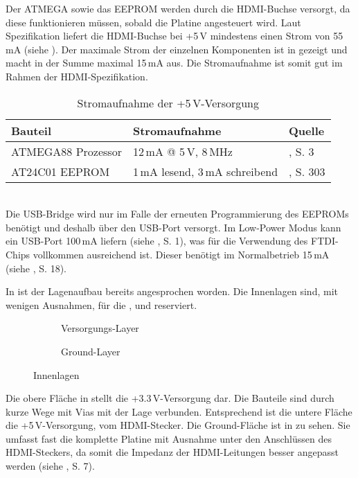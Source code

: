 Der ATMEGA sowie das EEPROM werden durch die HDMI-Buchse versorgt, da diese funktionieren müssen, sobald die Platine angesteuert wird. Laut Spezifikation liefert die HDMI-Buchse bei +5\,V mindestens einen Strom von 55\,mA (siehe \cite{HDMI11}). Der maximale Strom der einzelnen Komponenten ist in  gezeigt und macht in der Summe maximal 15\,mA aus. Die Stromaufnahme ist somit gut im Rahmen der HDMI-Spezifikation.
\begin{table}[h]
\begin{tabular}{|p{4cm}|p{5cm}|p{3.5cm}|}\hline
\rowcolor{TableBackgroundColor} 
   \textbf{Bauteil} & \textbf{Stromaufnahme} & \textbf{Quelle}	\\ \hline
    ATMEGA88 Prozessor & 12\,mA @ 5\,V, 8\,MHz	& \cite{Atmel2011}, S. 3\\ \hline
	AT24C01 EEPROM & 1\,mA lesend, 3\,mA schreibend & \cite{Atmel2003}, S. 303\\ \hline
\end{tabular}
\caption{Stromaufnahme der +5\,V-Versorgung}
\label{tab:5v_strom}
\end{table} \\
Die USB-Bridge  wird nur im Falle der erneuten Programmierung des EEPROMs benötigt und deshalb über den USB-Port versorgt. Im Low-Power Modus kann ein USB-Port 100\,mA liefern (siehe \cite{USB2005}, S. 1), was für die Verwendung des FTDI-Chips vollkommen ausreichend ist. Dieser benötigt im Normalbetrieb 15\,mA (siehe \cite{FTDI2010}, S. 18).

In  ist der Lagenaufbau bereits angesprochen worden. Die Innenlagen sind, mit wenigen Ausnahmen, für die ,  und  reserviert. 
\begin{figure}[htbp]
        \centering
        \begin{subfigure}[htp]{0.48\textwidth}
                \caption{Versorgungs-Layer}
                \label{fig:teilb_vcc_layer}
        \end{subfigure}
		\quad 
        \begin{subfigure}[htp]{0.48\textwidth}
                             								\caption{Ground-Layer}
                \label{fig:teilb_gnd_layer}
        \end{subfigure}
        \caption{Innenlagen}
        \label{fig:teilb_vcc_gnd_layer}
\end{figure}
Die obere Fläche in  stellt die +3.3\,V-Versorgung dar. Die Bauteile sind durch kurze Wege mit Vias mit der Lage verbunden. Entsprechend ist die untere Fläche die +5\,V-Versorgung, vom HDMI-Stecker. Die Ground-Fläche ist in  zu sehen. Sie umfasst fast die komplette Platine mit Ausnahme unter den Anschlüssen des HDMI-Steckers, da somit die Impedanz der HDMI-Leitungen besser angepasst werden (siehe \cite{TI2007}, S. 7). 